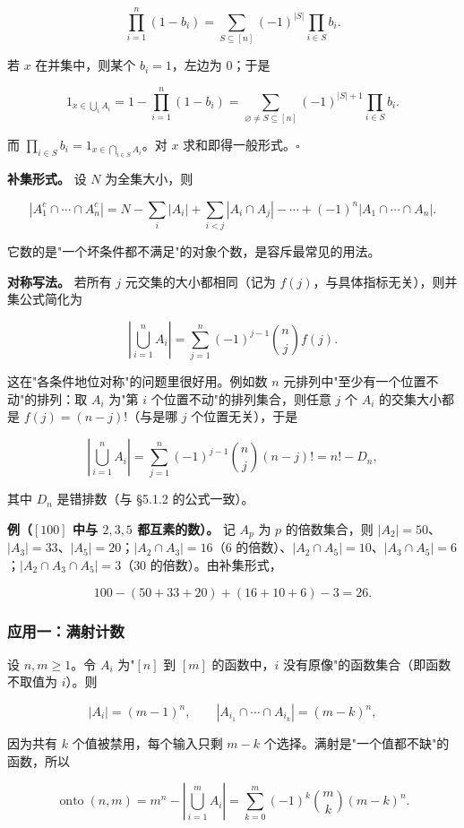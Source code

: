 \[
\prod_{i=1}^{n}(1-b_i)=\sum_{S\subseteq[n]}(-1)^{|S|}\prod_{i\in S}b_i .
\]

若 $x$ 在并集中，则某个 $b_i=1$，左边为 $0$；于是

\[
1_{x\in\bigcup_i A_i}=1-\prod_{i=1}^{n}(1-b_i)=\sum_{\varnothing\neq S\subseteq[n]}(-1)^{|S|+1}\prod_{i\in S}b_i .
\]

而 $\prod_{i\in S}b_i=1_{x\in\bigcap_{i\in S}A_i}$。对 $x$ 求和即得一般形式。$\square$

\textbf{补集形式。} 设 $N$ 为全集大小，则

\[
|A_1^c\cap\cdots\cap A_n^c|
=N-\sum_i|A_i|+\sum_{i<j}|A_i\cap A_j|-\cdots+(-1)^n|A_1\cap\cdots\cap A_n|.
\]

它数的是"一个坏条件都不满足"的对象个数，是容斥最常见的用法。

\textbf{对称写法。} 若所有 $j$ 元交集的大小都相同（记为 $f(j)$，与具体指标无关），则并集公式简化为

\[
\left|\bigcup_{i=1}^{n}A_i\right|
=\sum_{j=1}^{n}(-1)^{j-1}\binom nj f(j).
\]

这在"各条件地位对称"的问题里很好用。例如数 $n$ 元排列中"至少有一个位置不动"的排列：取 $A_i$ 为"第 $i$ 个位置不动"的排列集合，则任意 $j$ 个 $A_i$ 的交集大小都是 $f(j)=(n-j)!$（与是哪 $j$ 个位置无关），于是

\[
\left|\bigcup_{i=1}^{n}A_i\right|=\sum_{j=1}^{n}(-1)^{j-1}\binom nj(n-j)!=n!-D_n,
\]

其中 $D_n$ 是错排数（与 §5.1.2 的公式一致）。

\textbf{例（$[100]$ 中与 $2,3,5$ 都互素的数）。} 记 $A_p$ 为 $p$ 的倍数集合，则 $|A_2|=50$、$|A_3|=33$、$|A_5|=20$；$|A_2\cap A_3|=16$（$6$ 的倍数）、$|A_2\cap A_5|=10$、$|A_3\cap A_5|=6$；$|A_2\cap A_3\cap A_5|=3$（$30$ 的倍数）。由补集形式，

\[
100-(50+33+20)+(16+10+6)-3=26.
\]

\subsubsection{应用一：满射计数}


设 $n,m\ge1$。令 $A_i$ 为"$[n]$ 到 $[m]$ 的函数中，$i$ 没有原像"的函数集合（即函数不取值为 $i$）。则

\[
|A_i|=(m-1)^n,\qquad
|A_{i_1}\cap\cdots\cap A_{i_k}|=(m-k)^n,
\]

因为共有 $k$ 个值被禁用，每个输入只剩 $m-k$ 个选择。满射是"一个值都不缺"的函数，所以

\[
\operatorname{onto}(n,m)=m^n-\left|\bigcup_{i=1}^{m}A_i\right|
=\sum_{k=0}^{m}(-1)^k\binom mk(m-k)^n .
\]

